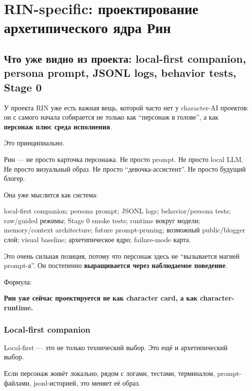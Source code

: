 \setcounter{chapter}{11}
\chapter{RIN-specific: проектирование архетипического ядра Рин}

\setcounter{section}{0}
\section{Что уже видно из проекта: local-first companion, persona prompt, JSONL logs, behavior tests, Stage 0}

У проекта RIN уже есть важная вещь, которой часто нет у character-AI
проектов: он с самого начала собирается не только как ``персонаж в
голове'', а как \textbf{персонаж плюс среда исполнения}.

Это принципиально.

Рин --- не просто карточка персонажа. Не просто prompt. Не просто local
LLM. Не просто визуальный образ. Не просто ``девочка-ассистент''. Не
просто будущий блогер.

Она уже мыслится как система:

local-first companion; persona prompt; JSONL logs; behavior/\hspace{0pt}persona
tests; raw/\hspace{0pt}guided режимы; Stage 0 smoke tests; runtime вокруг модели;
memory/\hspace{0pt}context architecture; future prompt-pruning; возможный
public/\hspace{0pt}blogger слой; visual baseline; архетипическое ядро; failure-mode
карта.

Это очень сильная позиция, потому что персонаж здесь не ``вызывается
магией prompt-а''. Он постепенно \textbf{выращивается через наблюдаемое
поведение}.

Формула:

\textbf{Рин уже сейчас проектируется не как character card, а как
character-runtime.}

\subsection*{Local-first companion}

Local-first --- это не только технический выбор. Это ещё и
архетипический выбор.

Если персонаж живёт локально, рядом с логами, тестами, терминалом,
prompt-файлами, jsonl-историей, это меняет её образ.


